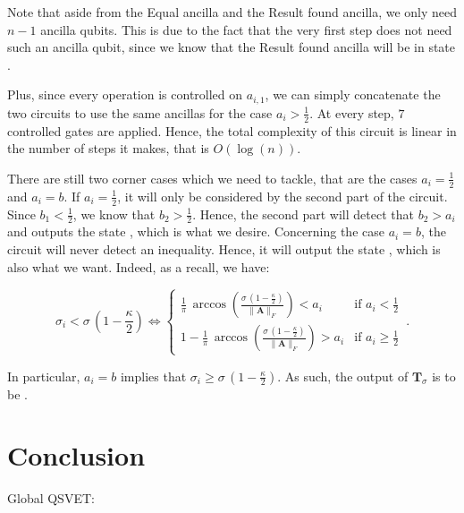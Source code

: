 \documentclass[11pt, a4paper]{article}
\begin{document}
                Note that aside from the Equal ancilla and the Result found ancilla, we only need \(n - 1\) ancilla qubits. This is due to the fact that the very first step does not need such an ancilla qubit, since we know that the Result found ancilla will be in state .
                
                Plus, since every operation is controlled on \(a_{i,1}\), we can simply concatenate the two circuits to use the same ancillas for the case \(a_i>\frac12\). At every step, \(7\) controlled gates are applied. Hence, the total complexity of this circuit is linear in the number of steps it makes, that is \(O(\log(n))\).
                
                There are still two corner cases which we need to tackle, that are the cases \(a_i=\frac12\) and \(a_i=b\). If \(a_i=\frac12\), it will only be considered by the second part of the circuit. Since \(b_1<\frac12\), we know that \(b_2>\frac12\). Hence, the second part will detect that \(b_2>a_i\) and outputs the state , which is what we desire. Concerning the case \(a_i=b\), the circuit will never detect an inequality. Hence, it will output the state , which is also what we want. Indeed, as a recall, we have:
                
                \[\sigma_i < \sigma\,\left(1 - \frac\kappa2\right)\iff\begin{cases}\frac1\pi\,\arccos\left(\frac{\sigma\,\left(1 - \frac\kappa2\right)}{\|\mathbf{A}\|_F}\right) < a_i&\text{if }a_i<\frac12\\1-\frac1\pi\,\arccos\left(\frac{\sigma\,\left(1 - \frac\kappa2\right)}{\|\mathbf{A}\|_F}\right) > a_i&\text{if }a_i\geqslant\frac12\end{cases}\,.\]
                
                In particular, \(a_i=b\) implies that \(\sigma_i \geqslant \sigma\,\left(1 - \frac\kappa2\right)\). As such, the output of \(\mathbf{T}_\sigma\) is to be .
                

    \section{Conclusion}            
        Global QSVET:
        
\end{document}
